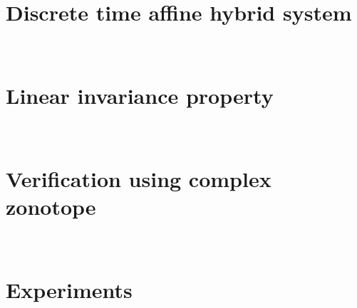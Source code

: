\section{Discrete time affine hybrid system}~\label{sec:hybrid-system}


\section{Linear invariance property}~\label{sec:linear-invariance}


\section{Verification using complex zonotope}~\label{sec:verification-invariance}


\section{Experiments}



